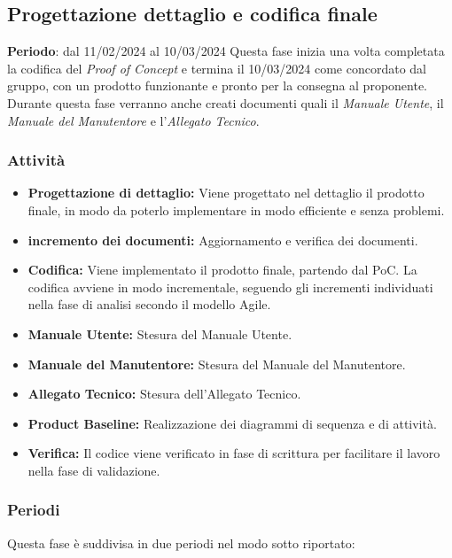 
\subsection{Progettazione dettaglio e codifica finale}\label{sec:pianificazione:progCodifica}

\textbf{Periodo}: dal 11/02/2024 al 10/03/2024
Questa fase inizia una volta completata la codifica del \textit{Proof of Concept} e termina il 10/03/2024 come concordato dal gruppo, con un prodotto funzionante e pronto per la consegna al proponente. Durante questa fase verranno anche creati documenti quali il \textit{Manuale Utente}, il \textit{Manuale del Manutentore} e l'\textit{Allegato Tecnico}.


\subsubsection{Attività}\label{sec:pianificazione:prog_codifica:attivita}
\begin{itemize}
    \item \textbf{Progettazione di dettaglio:} Viene progettato nel dettaglio il prodotto finale, in modo da poterlo implementare in modo efficiente e senza problemi. 
    \item \textbf{incremento dei documenti:} Aggiornamento e verifica dei documenti.
    \item \textbf{Codifica:} Viene implementato il prodotto finale, partendo dal PoC. La codifica avviene in modo incrementale, seguendo gli incrementi individuati nella fase di analisi secondo il modello Agile.
    \item \textbf{Manuale Utente:} Stesura del Manuale Utente.
    \item \textbf{Manuale del Manutentore:} Stesura del Manuale del Manutentore.
    \item \textbf{Allegato Tecnico:} Stesura dell'Allegato Tecnico.
    \item \textbf{Product Baseline:} Realizzazione dei diagrammi di sequenza e di attività.
    \item \textbf{Verifica:} Il codice viene verificato in fase di scrittura per facilitare il lavoro nella fase di validazione.
\end{itemize}

\newpage

\subsubsection{Periodi}\label{sec:pianificazione:prog_codifica:periodi}
Questa fase è suddivisa in due periodi nel modo sotto riportato:

